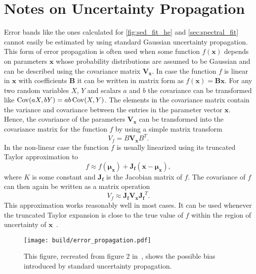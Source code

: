 \section{Notes on Uncertainty Propagation}
\label{sec:error_prob}
Error bands like the ones calculated for \cref{fig:sed_fit_he} and \ref{sec:spectral_fit} cannot easily be estimated by using standard 
Gaussian uncertainty propagation. This form of error propagation is often used when some function $f(\mathbf{x})$ depends on parameters $\mathbf{x}$ whose
probability distributions are assumed to be Gaussian and can be described using the covariance matrix $\mathbf{V_{\mathbf{x}}}$. 
In case the function $f$ is linear in $\mathbf{x}$  with coefficients $\mathbf{B}$ it can be written in matrix form as $f(\mathbf{x}) = \mathbf{B} \mathbf{x}$.
For any two random variables $X$, $Y$ and scalars $a$ and $b$ the covariance can be transformed like $\operatorname{Cov}(aX, bY) = ab \operatorname{Cov}(X, Y)$. 
The elements in the covariance matrix contain the variance and covariance between the entries in the parameter vector $\mathbf{x}$.
Hence, the covariance of the parameters $\mathbf{V_{\mathbf{x}}}$ can be transformed into the covariance matrix for the function $f$
by using a simple matrix transform 
\begin{equation*}
  V_{f} = B \mathbf{V_{\mathbf{x}}} B^T.
\end{equation*}
In the non-linear case the function $f$ is usually linearized using its truncated Taylor approximation to 
\begin{equation*}
  f \approx f(\mathbf{\mu_x}) + \mathbf{J_f} (\mathbf{x} - \mathbf{\mu_x}),
\end{equation*} 
where $K$ is some constant and $\mathbf{J_f}$ is the Jacobian matrix of $f$. 
The covariance of $f$ can then again be written as a matrix operation 
\begin{equation*}
  V_{f} \approx \mathbf{J_f} \mathbf{V_{\mathbf{x}}} \mathbf{J_f}^T.
\end{equation*}
This approximation works reasonably well in most cases. It can be used whenever the truncated Taylor expansion is close to the true value of $f$ within the region of uncertainty 
of $\mathbf{x}$~\cite{error_tr}. 
\begin{wrapfigure}{o}{0.5\linewidth}
  \centering
  \texttt{[image: build/error\_propagation.pdf]}
  \caption[Error propagation schematic explanation.]{This figure, recreated from figure 2 in~\cite{error_tr}, shows the possible bias introduced by standard uncertainty propagation.}
  \label{fig:error_propagation}
\end{wrapfigure}
